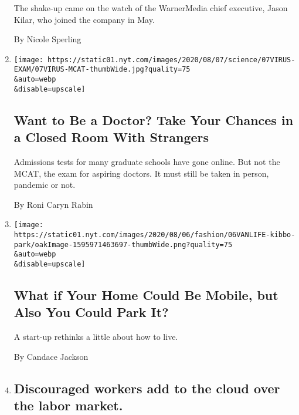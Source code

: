 \begin{enumerate}
  The shake-up came on the watch of the WarnerMedia chief executive,
  Jason Kilar, who joined the company in May.

  By Nicole Sperling
\item
  \href{/2020/08/07/health/coronavirus-exams-mcat.html}{}

  \texttt{[image: https://static01.nyt.com/images/2020/08/07/science/07VIRUS-EXAM/07VIRUS-MCAT-thumbWide.jpg?quality=75\\\&auto=webp\\\&disable=upscale]}

  \hypertarget{want-to-be-a-doctor-take-your-chances-in-a-closed-room-with-strangers}{%
  \subsection{Want to Be a Doctor? Take Your Chances in a Closed Room
  With
  Strangers}\label{want-to-be-a-doctor-take-your-chances-in-a-closed-room-with-strangers}}

  Admissions tests for many graduate schools have gone online. But not
  the MCAT, the exam for aspiring doctors. It must still be taken in
  person, pandemic or not.

  By Roni Caryn Rabin
\item
  \href{/2020/08/07/style/kibbo-van-life-startup.html}{}

  \texttt{[image: https://static01.nyt.com/images/2020/08/06/fashion/06VANLIFE-kibbo-park/oakImage-1595971463697-thumbWide.png?quality=75\\\&auto=webp\\\&disable=upscale]}

  \hypertarget{what-if-your-home-could-be-mobile-but-also-you-could-park-it}{%
  \subsection{What if Your Home Could Be Mobile, but Also You Could Park
  It?}\label{what-if-your-home-could-be-mobile-but-also-you-could-park-it}}

  A start-up rethinks a little about how to live.

  By Candace Jackson
\item
  \href{/2020/08/07/business/discouraged-workers-add-to-the-cloud-over-the-labor-market.html}{}

  \hypertarget{discouraged-workers-add-to-the-cloud-over-the-labor-market}{%
  \subsection{Discouraged workers add to the cloud over the labor
  market.}\label{discouraged-workers-add-to-the-cloud-over-the-labor-market}}


\end{enumerate}
